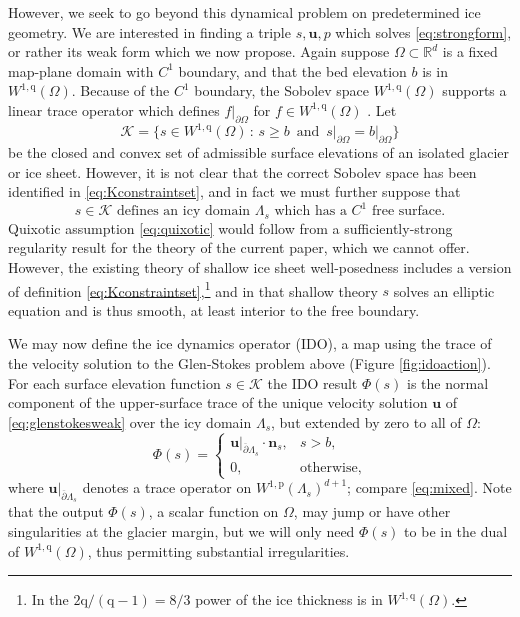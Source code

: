 \documentclass[letterpaper,final,12pt,reqno]{amsart}
\theoremstyle{claim}
\newcommand{\RR}{\mathbb{R}}
\newcommand{\bn}{\mathbf{n}}
\newcommand{\bu}{\mathbf{u}}
\newcommand{\pp}{{\text{p}}}
\newcommand{\qq}{{\text{q}}}
\numberwithin{equation}{section}
\numberwithin{figure}{section}
\numberwithin{table}{section}
\numberwithin{theorem}{section}
\begin{document}
However, we seek to go beyond this dynamical problem on predetermined ice geometry.  We are interested in finding a triple $s,\bu,p$ which solves \eqref{eq:strongform}, or rather its weak form which we now propose.  Again suppose $\Omega \subset \RR^d$ is a fixed map-plane domain with $C^1$ boundary, and that the bed elevation $b$ is in $W^{1,\qq}(\Omega)$.  Because of the $C^1$ boundary, the Sobolev space $W^{1,\qq}(\Omega)$ supports a linear trace operator which defines $f|_{\partial \Omega}$ for $f \in W^{1,\qq}(\Omega)$ \cite[Section 5.5]{Evans2010}.  Let
\begin{equation}
\mathcal{K} = \{s \in W^{1,\qq}(\Omega) \,:\, s \ge b \, \text{ and } \, s\big|_{\partial\Omega} = b\big|_{\partial\Omega}\}  \label{eq:Kconstraintset}
\end{equation}
be the closed and convex set of admissible surface elevations of an isolated glacier or ice sheet.  However, it is not clear that the correct Sobolev space has been identified in \eqref{eq:Kconstraintset}, and in fact we must further suppose that
\begin{equation}
s\in \mathcal{K} \text{ defines an icy domain } \Lambda_s \text{ which has a $C^1$ free surface.} \label{eq:quixotic}
\end{equation}
Quixotic assumption \eqref{eq:quixotic} would follow from a sufficiently-strong regularity result for the theory of the current paper, which we cannot offer.  However, the existing theory of shallow ice sheet well-posedness \cite{JouvetBueler2012} includes a version of definition \eqref{eq:Kconstraintset},\footnote{In \cite{JouvetBueler2012} the $2\qq/(\qq-1)=8/3$ power of the ice thickness is in $W^{1,\qq}(\Omega)$.} and in that shallow theory $s$ solves an elliptic equation and is thus smooth, at least interior to the free boundary.

We may now define the ice dynamics operator (IDO), a map using the trace of the velocity solution to the Glen-Stokes problem above (Figure \ref{fig:idoaction}).  For each surface elevation function $s \in \mathcal{K}$ the IDO result $\Phi(s)$ is the normal component of the upper-surface trace of the unique velocity solution $\bu$ of \eqref{eq:glenstokesweak} over the icy domain $\Lambda_s$, but extended by zero to all of $\Omega$:
\begin{equation}
\Phi(s) = \begin{cases} \bu|_{\overline{\partial} \Lambda_s} \cdot \bn_s, & s > b, \\
                        0, & \text{otherwise}, \end{cases} \label{eq:ido}
\end{equation}
where $\bu|_{\overline{\partial} \Lambda_s}$ denotes a trace operator on $W^{1,\pp}(\Lambda_s)^{d+1}$; compare \eqref{eq:mixed}.  Note that the output $\Phi(s)$, a scalar function on $\Omega$, may jump or have other singularities at the glacier margin, but we will only need $\Phi(s)$ to be in the dual of $W^{1,\qq}(\Omega)$, thus permitting substantial irregularities.
\end{document}
